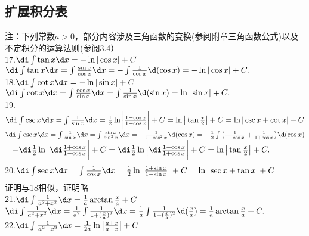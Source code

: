\subsection{扩展积分表}
\noindent 注：下列常数$a>0$，部分内容涉及三角函数的变换(参阅附章三角函数公式)以及不定积分的运算法则(参阅3.4）\vspace{-1em}\\
17.\enspace $\di\int \tan x\d x=-\ln |\cos x|+C$
\vspace{0.5em}\\ \proof $\di\int \tan x\d x=\int \frac{\sin x}{\cos x}\d x=-\int\frac{1}{\cos x}\d (\cos x)=-\ln|\cos x|+C.$\\
18.\enspace $\di\int \cot x\d x=-\ln |\sin x|+C$
\vspace{0.5em}\\ \proof $\di\int \cot x\d x=\int \frac{\cos x}{\sin x}\d x=\int\frac{1}{\sin x}\d (\sin x)=\ln|\sin x|+C.$\\
19.\enspace $\di\int \csc x\d x=\int\frac{1}{\sin x}\d x=\frac{1}{2}\ln \bigg|\frac{1-\cos x}{1+\cos x}\bigg|+C=\ln\big |\tan \frac{x}{2}\big|+C=\ln|\csc x+\cot x|+C
$
\vspace{0.5em}\\ \proof $\di\int \csc x\d x=\int \frac{1}{\sin x}\d x=\int\frac{\sin x}{\sin^2 x}\d x=-\frac{1}{1-\cos^2 x}\d (\cos x)=-\frac{1}{2}\int \big(\frac{1}{1-\cos x}+\frac{1}{1+\cos x}\big)\d(\cos x)$\\
=$-\di\frac{1}{2}\ln \bigg|\di\frac{1+\cos x}{1-\cos x}\bigg|+C=\di\frac{1}{2}\ln \bigg|\di\frac{1-\cos x}{1+\cos x}\bigg|+C=\ln\big |\tan \frac{x}{2}\big|+C. $
\vspace{0.5em}\\20.\enspace $\di\int \sec x\d x=\int\frac{1}{\cos x}\d x=\frac{1}{2}\ln \bigg|\frac{1+\sin x}{1-\sin x}\bigg|+C=\ln|\sec x+\tan x|+C
$
\vspace{0.5em}\\
\proof 证明与18相似，证明略\\
21.\enspace $\di\int\frac{1}{a^2+x^2}\d x=\frac{1}{a}\arctan\frac{x}{a}+C$\vspace{0.5em}\\
\proof $\di\int\frac{1}{a^2+x^2}\d x=\frac{1}{a^2}\int\frac{1}{1+(\frac{x}{a})^2}\d x=\frac{1}{a}\int\frac{1}{1+(\frac{x}{a})^2}\d(\frac{x}{a})=\frac{1}{a}\arctan\frac{x}{a}+C.$
\\ 
22.\enspace $\di\int\frac{1}{a^2-x^2}\d x=\frac{1}{2a}\ln \big|\frac{a+x}{a-x}\big|+C$\vspace{0.5em}\\
